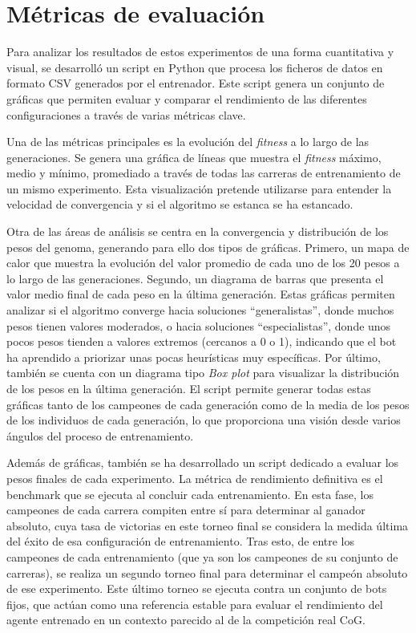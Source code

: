 \section{Métricas de evaluación} \label{sec:metricas_evaluacion}

Para analizar los resultados de estos experimentos de una forma cuantitativa y visual, se desarrolló un script en Python que procesa los ficheros de datos en formato CSV generados por el entrenador. Este script genera un conjunto de gráficas que permiten evaluar y comparar el rendimiento de las diferentes configuraciones a través de varias métricas clave.

Una de las métricas principales es la evolución del \textit{fitness} a lo largo de las generaciones. Se genera una gráfica de líneas que muestra el \textit{fitness} máximo, medio y mínimo, promediado a través de todas las carreras de entrenamiento de un mismo experimento. Esta visualización pretende utilizarse para entender la velocidad de convergencia y si el algoritmo se estanca se ha estancado.

Otra de las áreas de análisis se centra en la convergencia y distribución de los pesos del genoma, generando para ello dos tipos de gráficas. Primero, un mapa de calor que muestra la evolución del valor promedio de cada uno de los 20 pesos a lo largo de las generaciones. Segundo, un diagrama de barras que presenta el valor medio final de cada peso en la última generación. Estas gráficas permiten analizar si el algoritmo converge hacia soluciones ``generalistas'', donde muchos pesos tienen valores moderados, o hacia soluciones ``especialistas'', donde unos pocos pesos tienden a valores extremos (cercanos a 0 o 1), indicando que el bot ha aprendido a priorizar unas pocas heurísticas muy específicas. Por último, también se cuenta con un diagrama tipo \textit{Box plot} para visualizar la distribución de los pesos en la última generación. El script permite generar todas estas gráficas tanto de los campeones de cada generación como de la media de los pesos de los individuos de cada generación, lo que proporciona una visión desde varios ángulos del proceso de entrenamiento.

Además de gráficas, también se ha desarrollado un script dedicado a evaluar los pesos finales de cada experimento. La métrica de rendimiento definitiva es el benchmark que se ejecuta al concluir cada entrenamiento. En esta fase, los campeones de cada carrera compiten entre sí para determinar al ganador absoluto, cuya tasa de victorias en este torneo final se considera la medida última del éxito de esa configuración de entrenamiento. Tras esto, de entre los campeones de cada entrenamiento (que ya son los campeones de su conjunto de carreras), se realiza un segundo torneo final para determinar el campeón absoluto de ese experimento. Este último torneo se ejecuta contra un conjunto de bots fijos, que actúan como una referencia estable para evaluar el rendimiento del agente entrenado en un contexto parecido al de la competición real CoG.

